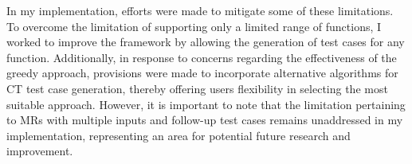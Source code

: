 In my implementation, efforts were made to mitigate some of these limitations. To overcome the limitation of supporting only a limited range of functions, I worked to improve the framework by allowing the generation of test cases for any function. Additionally, in response to concerns regarding the effectiveness of the greedy approach, provisions were made to incorporate alternative algorithms for CT test case generation, thereby offering users flexibility in selecting the most suitable approach. However, it is important to note that the limitation pertaining to MRs with multiple inputs and follow-up test cases remains unaddressed in my implementation, representing an area for potential future research and improvement.
